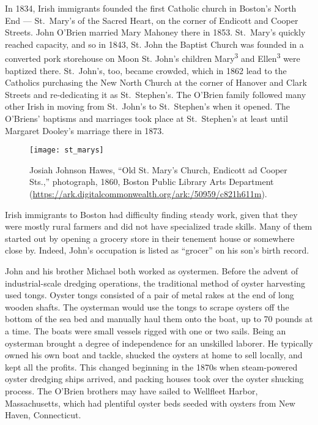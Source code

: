 In 1834, Irish immigrants founded the first Catholic church in Boston's North End --- St.\ Mary's of the Sacred Heart, on the corner of Endicott and Cooper Streets.\cite{Todisco:26} John O'Brien married Mary Mahoney there in 1853.\cite{John2OBrienMarriage} St.\ Mary's quickly reached capacity, and so in 1843, St. John the Baptist Church was founded in a converted pork storehouse on Moon St.\cite{Goldfeld:101,Sullivan:128} John's children Mary\textsuperscript{3} and Ellen\textsuperscript{3} were baptized there. St.\ John's, too, became crowded, which in 1862 lead to the Catholics purchasing the New North Church at the corner of Hanover and Clark Streets and re-dedicating it as St.\ Stephen's.\cite{Sullivan:128} The O'Brien family followed many other Irish in moving from St.\ John's to St.\ Stephen's when it opened. The O'Briens' baptisms and marriages took place at St.\ Stephen's at least until Margaret Dooley's marriage there in 1873.\cite{RobertFernaldMarriage}

\begin{figure}
	\centering
	\texttt{[image: st\_marys]}
	\caption{Josiah Johnson Hawes, ``Old St. Mary's Church, Endicott ad Cooper Sts.,'' photograph, 1860, Boston Public Library Arts Department (\url{https://ark.digitalcommonwealth.org/ark:/50959/c821h611m}).}
\end{figure}

Irish immigrants to Boston had difficulty finding steady work, given that they were mostly rural farmers and did not have specialized trade skills.\cite{Ryan:21} Many of them started out by opening a grocery store in their tenement house or somewhere close by.\cite{Ryan:83} Indeed, John's occupation is listed as ``grocer'' on his son's birth record.\cite{John3OBrienBirth} 

John and his brother Michael both worked as oystermen.\cite{EdwardFrancis3OBrienBirth,Michael2OBrien1886,1861John2OBrien} Before the advent of industrial-scale dredging operations, the traditional method of oyster harvesting used tongs. Oyster tongs consisted of a pair of metal rakes at the end of long wooden shafts. The oysterman would use the tongs to scrape oysters off the bottom of the sea bed and manually haul them onto the boat, up to 70 pounds at a time. The boats were small vessels rigged with one or two sails.\cite{Botwick:95} Being an oysterman brought a degree of independence for an unskilled laborer. He typically owned his own boat and tackle, shucked the oysters at home to sell locally, and kept all the profits.\cite{MacKenzie:7, Botwick:96} This changed beginning in the 1870s when steam-powered oyster dredging ships arrived, and packing houses took over the oyster shucking process.\cite{MacKenzie:5, MacKenzie:7} The O'Brien brothers may have sailed to Wellfleet Harbor, Massachusetts, which had plentiful oyster beds seeded with oysters from New Haven, Connecticut.\cite{MacKenzie:29}

